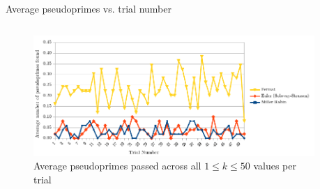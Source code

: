 \documentclass[pdf]{beamer}
\begin{document}
\begin{frame}{Average pseudoprimes vs. trial number}
    \begin{columns}[t, onlytextwidth]
        \begin{column}{0.65\textwidth}
            \begin{figure}[h!]
                \caption{Average pseudoprimes passed across all $1 \leq k \leq 50$ values per trial}
                \label{fig:pprimes_v_trial}
                \centering
                \includegraphics[width=\textwidth]{pprimes_v_trial}
            \end{figure}
        \end{column}
        \begin{column}{0.35\textwidth}
            \fontsize{8}{9}\selectfont
            \begin{outline}
                \pause
            \end{outline}
        \end{column}
    \end{columns}
\end{frame}
\end{document}
